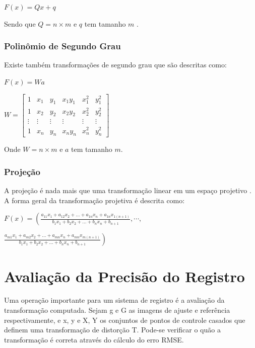 \documentclass[9pt, a4paper, nofonttune, journal]{IEEEtran}
\begin{document}
\begin{center}
$F(x)=Qx+q$\end{center}
Sendo que $Q=n\times m$ e $q$ tem tamanho $m$ \cite{CGPPBook1}.

\subsubsection{Polinômio de Segundo Grau}
Existe também transformações de segundo grau que são descritas como:
\begin{center}
$F(x)=Wa$\end{center}

\begin{center}
$W=\begin{bmatrix}1 & x_{1} & y_{1} & x_{1}y_{1} & x_{1}^{2} & y_{1}^{2}\\
1 & x_{2} & y_{2} & x_{2}y_{2} & x_{2}^{2} & y_{2}^{2}\\
\vdots & \vdots & \vdots & \vdots & \vdots & \vdots\\
1 & x_{n} & y_{n} & x_{n}y_{n} & x_{n}^{2} & y_{n}^{2}
\end{bmatrix}$\end{center}
Onde $W=n\times m$ e $a$ tem tamanho $m$.\cite{Schowengerdt}

\subsubsection{Projeção}

A projeção é nada mais que uma transformação linear em um espaço projetivo \cite{CGPPBook1}. A forma geral da transformação projetiva é descrita como:

$F(x)=\left( \frac{a_{11}x_{1}+a_{12}x_{2}+...+a_{1n}x_{n}+a_{1n}x_{1(n+1)}}{b_{1}x_{1}+b_{2}x_{2}+...+b_{n}x_{n}+b_{n+1}},\cdots,\right.$

\begin{center}
$\left. \frac{a_{m1}x_{1}+a_{m2}x_{2}+...+a_{mn}x_{n}+a_{mn}x_{m(n+1)}}{b_{1}x_{1}+b_{2}x_{2}+...+b_{n}x_{n}+b_{n+1}} \right)$\end{center}

\section{Avaliação da Precisão do Registro}
Uma operação importante para um sistema de registro é a avaliação da transformação computada. Sejam {g} e {G} as imagens de ajuste e referência respectivamente, e {x, y} e {X, Y} os conjuntos de pontos de controle casados que definem uma transformação de distorção {T}. Pode-se verificar o quão a transformação é correta através do cálculo do erro RMSE.
\end{document}
